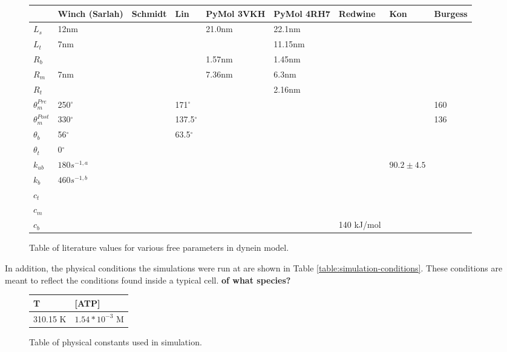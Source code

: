 \documentclass[10pt]{article} %
\begin{document}
\begin{figure}[h]
  \centering
  \begin{tabular}{| l | l | l | l | l | l | l | l | l |}
    \hline
    & Winch (Sarlah) & Schmidt & Lin & PyMol 3VKH & PyMol 4RH7 & Redwine & Kon & Burgess \\\hline
    $L_s$ & 12nm & & & 21.0nm & 22.1nm & & & \\ \hline
    $L_t$ &  7nm & & & & 11.15nm & & & \\ \hline
    $R_b$ &  & & & 1.57nm & 1.45nm & & & \\ \hline
    $R_m$ &  7nm & & & 7.36nm & 6.3nm & & & \\ \hline
    $R_t$ &  & & & & 2.16nm & & & \\ \hline
    $\theta_{m}^{Pre}$ & 250$^{\circ}$ & & 171$^{\circ}$ & & & & & 160\\ \hline
    $\theta_{m}^{Post}$ & 330$^{\circ}$ & & 137.5$^{\circ}$ & & & & & 136\\ \hline
    $\theta_{b}$ & 56$^{\circ}$ & & 63.5$^{\circ}$ & & & & & \\ \hline
    $\theta_{t}$ & 0$^{\circ}$ & & & & & & & \\ \hline
    $k_{ub}$ & $180 s^{-1,a}$ & & & & & & $90.2 \pm 4.5$& \\ \hline
    $k_b$ & $460 s^{-1,b}$ & & & & & & & \\ \hline
    $c_t$ & & & & & & & & \\ \hline
    $c_m$ & & & & & & & & \\ \hline
    $c_b$ & & & & & & 140 kJ/mol & & \\ \hline
  \end{tabular}
  \caption{Table of literature values for various free parameters in dynein model.}
  \label{table:parameter-table}
\end{figure}

In addition, the physical conditions the simulations were run at are shown in Table \ref{table:simulation-conditions}. These conditions are meant to reflect the conditions found inside a typical cell. \textbf{of what species?}\\

\begin{figure}[h]
  \centering
  \begin{tabular}{| l | l |}
    \hline
    T & [ATP] \\ \hline
    310.15 K & $1.54*10^{-3}$ M \cite{cellular-atp}\\ \hline
  \end{tabular}
  \caption{Table of physical constants used in simulation.}
  \label{table:parameter-table}
\end{figure}
\end{document}
